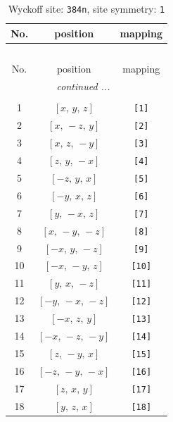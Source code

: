 \documentclass[fleqn,8pt]{jsarticle}
\begin{document}
\begin{longtable}{ccc}
\caption{Wyckoff site: {\tt 384n}, site symmetry: {\tt 1}}
 \\
 \hline \hline
No. & position & mapping \\ \hline \endfirsthead

\multicolumn{2}{l}{\tablename\ \thetable{}} \\
 \hline \hline
No. & position & mapping \\ \hline \endhead

 \hline \hline
\multicolumn{2}{r}{\footnotesize\it continued ...} \\ \endfoot

 \hline \hline
\multicolumn{2}{r}{} \\ \endlastfoot

1 & $\left[ x,\, y,\, z \right]$ & {\tt [1]} \\ \hline
2 & $\left[ x,\, - z,\, y \right]$ & {\tt [2]} \\ \hline
3 & $\left[ x,\, z,\, - y \right]$ & {\tt [3]} \\ \hline
4 & $\left[ z,\, y,\, - x \right]$ & {\tt [4]} \\ \hline
5 & $\left[ - z,\, y,\, x \right]$ & {\tt [5]} \\ \hline
6 & $\left[ - y,\, x,\, z \right]$ & {\tt [6]} \\ \hline
7 & $\left[ y,\, - x,\, z \right]$ & {\tt [7]} \\ \hline
8 & $\left[ x,\, - y,\, - z \right]$ & {\tt [8]} \\ \hline
9 & $\left[ - x,\, y,\, - z \right]$ & {\tt [9]} \\ \hline
10 & $\left[ - x,\, - y,\, z \right]$ & {\tt [10]} \\ \hline
11 & $\left[ y,\, x,\, - z \right]$ & {\tt [11]} \\ \hline
12 & $\left[ - y,\, - x,\, - z \right]$ & {\tt [12]} \\ \hline
13 & $\left[ - x,\, z,\, y \right]$ & {\tt [13]} \\ \hline
14 & $\left[ - x,\, - z,\, - y \right]$ & {\tt [14]} \\ \hline
15 & $\left[ z,\, - y,\, x \right]$ & {\tt [15]} \\ \hline
16 & $\left[ - z,\, - y,\, - x \right]$ & {\tt [16]} \\ \hline
17 & $\left[ z,\, x,\, y \right]$ & {\tt [17]} \\ \hline
18 & $\left[ y,\, z,\, x \right]$ & {\tt [18]} \\ \hline

\end{longtable}
\end{document}
